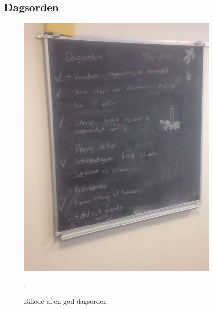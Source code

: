 \documentclass[oneside,a4paper,titlepage]{article}
\begin{document}
\subsection{Dagsorden}
\begin{figure}[H]
   \centering
   \includegraphics[width=10cm]{./../graphics/dagsorden}
   \caption{Billede af en god dagsorden}.
   \label{fig:dagsorden}
\end{figure}
\end{document}
